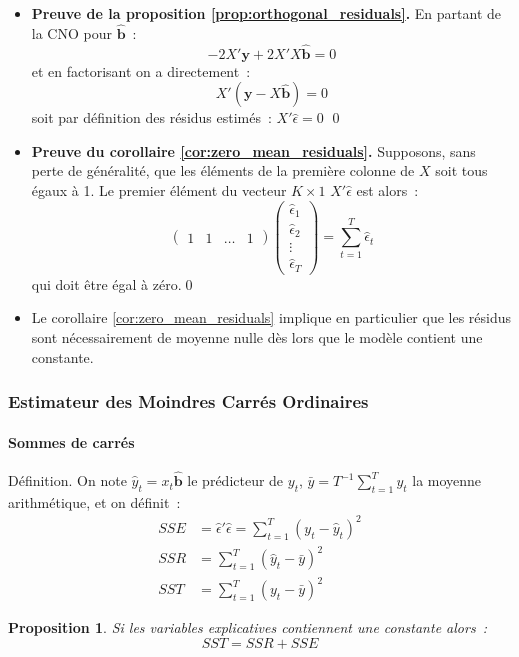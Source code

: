 \documentclass[10pt]{beamer}
\theoremstyle{plain}
\newenvironment{defn}[1]
{\bgroup \small\begin{block}{Définition. #1}}
  {\end{block}\egroup}
\newtheorem{prop}{Proposition}
\begin{document}
\begin{notes}
  \begin{itemize}

      \item \textbf{Preuve de la proposition \ref{prop:orthogonal_residuals}.} En partant de la CNO pour $\hat{\mathbf b}$~:
  \[
    -2X'\mathbf y + 2 X'X \hat{\mathbf b} = 0
  \]
  et en factorisant on a directement~:
    \[
      X'(\mathbf y - X \hat{\mathbf b}) = 0
    \]
    soit par définition des résidus estimés~:  $X'\hat\epsilon = 0$ \qed\newline

    \item \textbf{Preuve du corollaire \ref{cor:zero_mean_residuals}.} Supposons, sans perte de généralité, que les éléments de la première colonne de $X$ soit tous égaux à 1. Le premier élément du vecteur $K\times 1$ $X'\hat\epsilon$ est alors~:
    \[
      \begin{pmatrix}
        1 & 1 & \ldots & 1
      \end{pmatrix}
      \begin{pmatrix}
        \hat\epsilon_1\\
        \hat\epsilon_2\\
        \vdots\\
        \hat\epsilon_T
      \end{pmatrix} = \sum_{t=1}^T\hat\epsilon_t
    \]
    qui doit être égal à zéro.\qed\newline

  \item Le corollaire \ref{cor:zero_mean_residuals} implique en particulier que les
      résidus sont nécessairement de moyenne nulle dès lors que le modèle contient
      une constante.

  \end{itemize}
\end{notes}

\begin{frame}
  \frametitle{Estimateur des Moindres Carrés Ordinaires}
  \framesubtitle{Sommes de carrés}

  \begin{defn}{}
    On note $\hat y_t = x_t \hat{\mathbf b}$ le prédicteur de $y_t$, $\bar y = T^{-1}\sum_{t=1}^T y_t$ la moyenne arithmétique, et on définit~:
    \[
      \begin{split}
        SSE &= \hat\epsilon'\hat\epsilon = \sum_{t=1}^T(y_t-\hat y_t)^2\\
        SSR &= \sum_{t=1}^T(\hat y_t-\bar y)^2\\
        SST &= \sum_{t=1}^T(y_t-\bar y)^2
      \end{split}
    \]
  \end{defn}

  \bigskip

  \begin{prop}\label{prop:SST_SSR_SSE}
    Si les variables explicatives contiennent une constante alors~:
    \[
    SST = SSR + SSE
  \]
  \end{prop}

\end{frame}
\end{document}
